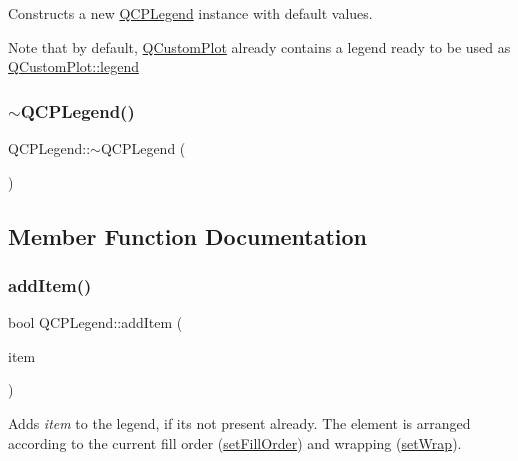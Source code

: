 Constructs a new \mbox{\hyperlink{class_q_c_p_legend}{Q\+C\+P\+Legend}} instance with default values.

Note that by default, \mbox{\hyperlink{class_q_custom_plot}{Q\+Custom\+Plot}} already contains a legend ready to be used as \mbox{\hyperlink{class_q_custom_plot_a4eadcd237dc6a09938b68b16877fa6af}{Q\+Custom\+Plot\+::legend}} \mbox{\label{class_q_c_p_legend_a52b305572e20f4e7cb37e945e2b9bec0}} 
\subsubsection{\texorpdfstring{$\sim$QCPLegend()}{~QCPLegend()}}
{\footnotesize\ttfamily Q\+C\+P\+Legend\+::$\sim$\+Q\+C\+P\+Legend (\begin{DoxyParamCaption}{ }\end{DoxyParamCaption})\hspace{0.3cm}{\ttfamily [virtual]}}



\subsection{Member Function Documentation}
\mbox{\label{class_q_c_p_legend_a3ab274de52d2951faea45a6d975e6b3f}} 
\subsubsection{\texorpdfstring{addItem()}{addItem()}}
{\footnotesize\ttfamily bool Q\+C\+P\+Legend\+::add\+Item (\begin{DoxyParamCaption}\item[{\mbox{\hyperlink{class_q_c_p_abstract_legend_item}{Q\+C\+P\+Abstract\+Legend\+Item}} $\ast$}]{item }\end{DoxyParamCaption})}

Adds {\itshape item} to the legend, if it\textquotesingle{}s not present already. The element is arranged according to the current fill order (\mbox{\hyperlink{class_q_c_p_layout_grid_affc2f3cfd22f28698c5b29b960d2a391}{set\+Fill\+Order}}) and wrapping (\mbox{\hyperlink{class_q_c_p_layout_grid_ab36af18d77e4428386d02970382ee598}{set\+Wrap}}).

